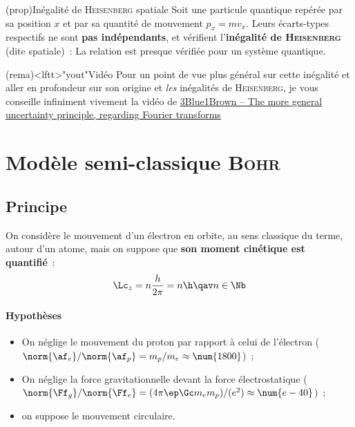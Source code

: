 \documentclass[../../main/main.tex]{subfiles}
\begin{document}
\begin{tcb*}(prop){Inégalité de \textsc{Heisenberg} spatiale}
	Soit une particule quantique repérée par sa position $x$ et par sa quantité de
	mouvement $p_x = mv_x$. Leurs écarts-types respectifs ne sont \textbf{pas
		indépendants}, et vérifient l'\textbf{inégalité de \textsc{Heisenberg}} (dite
	spatiale)~:
	La relation est presque vérifiée pour un système quantique.
\end{tcb*}

\begin{tcb}(rema)<lftt>"yout"{Vidéo}
	Pour un point de vue plus général sur cette inégalité et aller en profondeur
	sur son origine et \textit{les} inégalités de \textsc{Heisenberg}, je vous
	conseille infiniment vivement la vidéo de
	\href{https://youtu.be/MBnnXbOM5S4?si=trw2JoEydXDxsmM2}{3Blue1Brown -- The more
		general uncertainty principle, regarding Fourier transforms}
\end{tcb}

\section{Modèle semi-classique \textsc{Bohr}}
\label{sec:bohr}
\subsection{Principe}
\label{ssec:bohrprin}
On considère le mouvement d'un électron en orbite, au sens classique du terme,
autour d'un atome, mais on suppose que \textbf{son moment cinétique est
	quantifié}~:
\[
	\Lc_z = n \frac{h}{2\pi} = n\h
	\qav
	n \in \Nb
\]
\paragraph*{Hypothèses}
\begin{itemize}
	\item On néglige le mouvement du proton par rapport à celui de l'électron
	      ($\norm{\af_e}/\norm{\af_p} = m_p/m_e \approx \num{1800}$)~;
	\item On néglige la force gravitationnelle devant la force électrostatique
	      ($\norm{\Ff_g}/\norm{\Ff_e} = (4\pi \ep \Gc m_em_p)/(e^2) \approx
		      \num{e-40}$)~;
	\item on suppose le mouvement circulaire.
\end{itemize}
\end{document}
